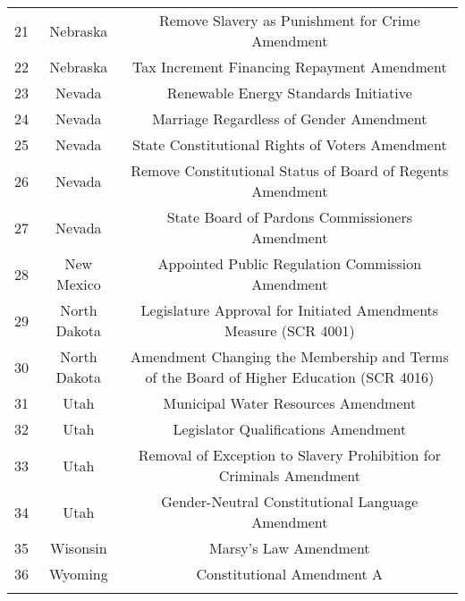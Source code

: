 \begin{table}[!htbp]
\begin{tabular}{@{\extracolsep{0pt}} ccc}
21 & Nebraska & Remove Slavery as Punishment for Crime Amendment \\ 
22 & Nebraska & Tax Increment Financing Repayment Amendment \\ 
23 & Nevada & Renewable Energy Standards Initiative \\ 
24 & Nevada & Marriage Regardless of Gender Amendment \\ 
25 & Nevada & State Constitutional Rights of Voters Amendment \\ 
26 & Nevada & Remove Constitutional Status of Board of Regents Amendment \\ 
27 & Nevada & State Board of Pardons Commissioners Amendment \\ 
28 & New Mexico & Appointed Public Regulation Commission Amendment \\ 
29 & North Dakota & Legislature Approval for Initiated Amendments Measure (SCR 4001) \\ 
30 & North Dakota & Amendment Changing the Membership and Terms of the Board of Higher Education (SCR 4016) \\ 
31 & Utah & Municipal Water Resources Amendment \\ 
32 & Utah & Legislator Qualifications Amendment \\ 
33 & Utah & Removal of Exception to Slavery Prohibition for Criminals Amendment \\ 
34 & Utah & Gender-Neutral Constitutional Language Amendment \\ 
35 & Wisonsin & Marsy's Law Amendment \\ 
36 & Wyoming & Constitutional Amendment A \\ 
\hline \\[-1.8ex] 
\end{tabular} 
\end{table} 
